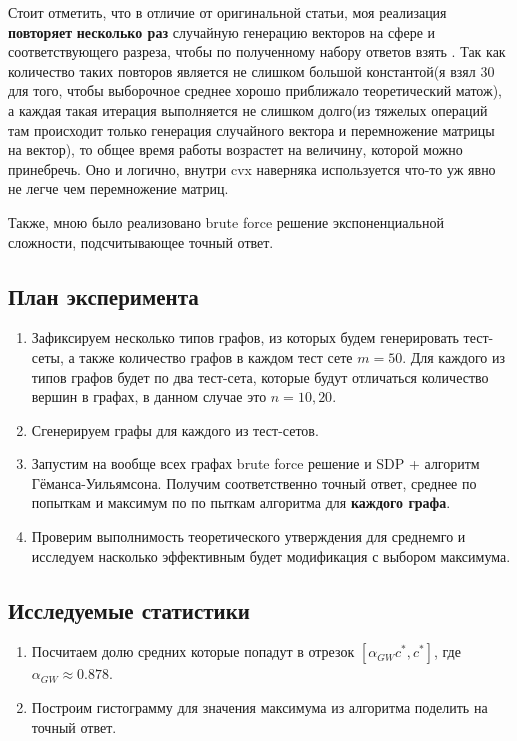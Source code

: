 \documentclass[12pt, a4paper]{article}
\begin{document}
Стоит отметить, что в отличие от оригинальной статьи, моя реализация \textbf{повторяет} \textbf{несколько раз} случайную генерацию векторов на сфере и соответствующего разреза, чтобы по полученному набору ответов взять . Так как количество таких повторов является не слишком большой константой(я взял $30$ для того, чтобы выборочное среднее хорошо приближало теоретический матож), а каждая такая итерация выполняется не слишком долго(из тяжелых операций там происходит только генерация случайного вектора и перемножение матрицы на вектор), то общее время работы возрастет на величину, которой можно принебречь. Оно и логично, внутри cvx наверняка используется что-то уж явно не легче чем перемножение матриц.

Также, мною было реализовано brute force решение экспоненциальной сложности, подсчитывающее точный ответ.\\

\subsection{План эксперимента}

\begin{enumerate}
    \item Зафиксируем несколько типов графов, из которых будем генерировать тест-сеты, а также количество графов в каждом тест сете $m=50$. Для каждого из типов графов будет по два тест-сета, которые будут отличаться количество вершин в графах, в данном случае это $n=10,20$.
    \item Сгенерируем графы для каждого из тест-сетов.
    \item Запустим на вообще всех графах brute force решение и SDP + алгоритм Гёманса-Уильямсона. Получим соответственно точный ответ, среднее по попыткам и максимум по по пыткам алгоритма для \textbf{каждого графа}.
    \item Проверим выполнимость теоретического утверждения для среднемго и исследуем насколько эффективным будет модификация с выбором максимума.
\end{enumerate}

\subsection{Исследуемые статистики}

\begin{enumerate}
    \item Посчитаем долю средних которые попадут в отрезок $[\alpha_{GW} c^*, c^*]$, где $\alpha_{GW} \approx 0.878$.
    \item Построим гистограмму для значения максимума из алгоритма поделить на точный ответ.
\end{enumerate}
\end{document}
